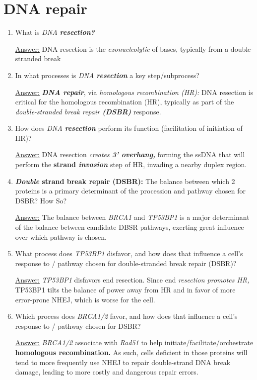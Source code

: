 \documentclass{article}
\newenvironment{QandA}{\begin{enumerate}[label=\bfseries Q\arabic*.]}
                       {\end{enumerate}}
\newenvironment{answered}{\par\normalfont\underline{Answer:}}{}
\begin{document}
\section{DNA repair}
\begin{QandA}
  \item{What is \textit{DNA \textbf{resection?}}}
    \begin{answered}
    DNA resection is the \textit{exonucleolytic } of bases, typically from a double-stranded break
    \end{answered}
  \item{In what processes is \textit{DNA \textbf{resection}} a key step/subprocess?}
    \begin{answered}
    \textbf{\textit{DNA repair}}, via \textit{homologous recombination (HR):} DNA resection is critical for the homologous recombination (HR), typically as part of the \textit{double-stranded break repair \textbf{(DSBR)}} response.
    \end{answered}
  \item{How does \textit{DNA \textbf{resection}} perform its function (facilitation of initiation of HR)?}
    \begin{answered}
    DNA resection \textit{creates \textbf{3' overhang,}} forming the ssDNA that will perform the \textbf{strand \textit{invasion}} step of HR, invading a nearby duplex region.
    \end{answered}
  \item{\textbf{\textit{Double} strand break repair (DSBR):} The balance between which 2 proteins is a primary determinant of the procession and pathway chosen for DSBR? How So?}
    \begin{answered}
    The balance between \textit{BRCA1} and \textit{TP53BP1} is a major determinant of the balance between candidate DBSR pathways, exerting great influence over which pathway is chosen.
    \end{answered}
  \item{What process does \textit{TP53BP1} disfavor, and how does that influence a cell's response to / pathway chosen for double-stranded break repair (DSBR)?}
    \begin{answered}
    \textit{TP53BP1} disfavors end resection. Since end \textit{resection promotes HR,} TP53BP1 tilts the balance of power away from HR and in favor of more error-prone NHEJ, which is worse for the cell.
    \end{answered}
  \item{Which process does \textit{BRCA1/2} favor, and how does that influence a cell's response to / pathway chosen for DSBR?}
    \begin{answered}
    \textit{BRCA1/2} associate with \textit{Rad51} to help initiate/facilitate/orchestrate \textbf{homologous recombination.} As such, cells deficient in those proteins will tend to more frequently use NHEJ to repair double-strand DNA break damage, leading to more costly and dangerous repair errors.
    \end{answered}
\end{QandA}
\end{document}
